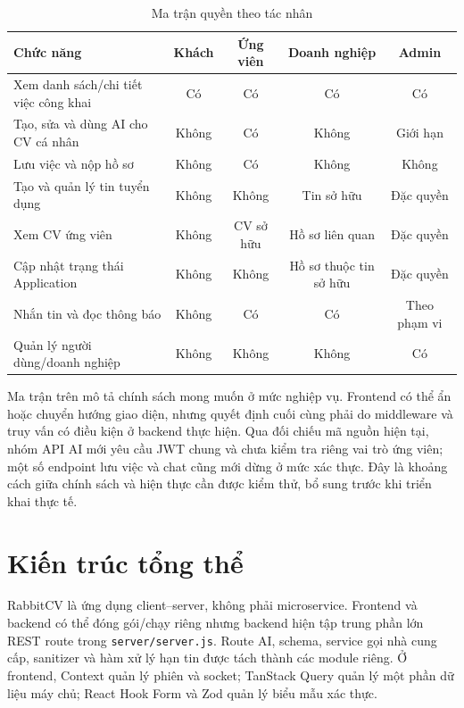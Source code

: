 \begin{table}[H]
    \centering
    \scriptsize
    \begin{tabularx}{\textwidth}{|Y|c|c|c|c|} \hline
        \textbf{Chức năng} & \textbf{Khách} & \textbf{Ứng viên} & \textbf{Doanh nghiệp} & \textbf{Admin} \\ \hline
        Xem danh sách/chi tiết việc công khai & Có & Có & Có & Có \\ \hline
        Tạo, sửa và dùng AI cho CV cá nhân & Không & Có & Không & Giới hạn \\ \hline
        Lưu việc và nộp hồ sơ & Không & Có & Không & Không \\ \hline
        Tạo và quản lý tin tuyển dụng & Không & Không & Tin sở hữu & Đặc quyền \\ \hline
        Xem CV ứng viên & Không & CV sở hữu & Hồ sơ liên quan & Đặc quyền \\ \hline
        Cập nhật trạng thái Application & Không & Không & Hồ sơ thuộc tin sở hữu & Đặc quyền \\ \hline
        Nhắn tin và đọc thông báo & Không & Có & Có & Theo phạm vi \\ \hline
        Quản lý người dùng/doanh nghiệp & Không & Không & Không & Có \\ \hline
    \end{tabularx}
    \caption{Ma trận quyền theo tác nhân}
    \label{tab:role-matrix}
\end{table}

Ma trận trên mô tả chính sách mong muốn ở mức nghiệp vụ. Frontend có thể ẩn hoặc chuyển hướng giao diện, nhưng quyết định cuối cùng phải do middleware và truy vấn có điều kiện ở backend thực hiện. Qua đối chiếu mã nguồn hiện tại, nhóm API AI mới yêu cầu JWT chung và chưa kiểm tra riêng vai trò ứng viên; một số endpoint lưu việc và chat cũng mới dừng ở mức xác thực. Đây là khoảng cách giữa chính sách và hiện thực cần được kiểm thử, bổ sung trước khi triển khai thực tế.

\section{Kiến trúc tổng thể}

RabbitCV là ứng dụng client--server, không phải microservice. Frontend và backend có thể đóng gói/chạy riêng nhưng backend hiện tập trung phần lớn REST route trong \texttt{server/server.js}. Route AI, schema, service gọi nhà cung cấp, sanitizer và hàm xử lý hạn tin được tách thành các module riêng. Ở frontend, Context quản lý phiên và socket; TanStack Query quản lý một phần dữ liệu máy chủ; React Hook Form và Zod quản lý biểu mẫu xác thực.

